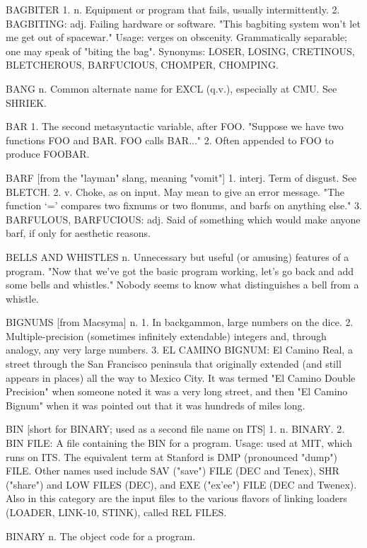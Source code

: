 BAGBITER 1. n. Equipment or program that fails, usually
   intermittently.  2. BAGBITING: adj. Failing hardware or software.
   "This bagbiting system won't let me get out of spacewar."  Usage:
   verges on obscenity.	 Grammatically separable; one may speak of
   "biting the bag".  Synonyms: LOSER, LOSING, CRETINOUS, BLETCHEROUS,
   BARFUCIOUS, CHOMPER, CHOMPING.

BANG n. Common alternate name for EXCL (q.v.), especially at CMU.  See
   SHRIEK.

BAR 1. The second metasyntactic variable, after FOO.  "Suppose we have
   two functions FOO and BAR.  FOO calls BAR..."  2. Often appended to
   FOO to produce FOOBAR.

BARF [from the "layman" slang, meaning "vomit"] 1. interj. Term of
   disgust.  See BLETCH.  2. v. Choke, as on input.  May mean to give
   an error message.  "The function `=' compares two fixnums or two
   flonums, and barfs on anything else."  3. BARFULOUS, BARFUCIOUS:
   adj. Said of something which would make anyone barf, if only for
   aesthetic reasons.

BELLS AND WHISTLES n. Unnecessary but useful (or amusing) features of
   a program.  "Now that we've got the basic program working, let's go
   back and add some bells and whistles."  Nobody seems to know what
   distinguishes a bell from a whistle.

BIGNUMS [from Macsyma] n. 1. In backgammon, large numbers on the dice.
   2. Multiple-precision (sometimes infinitely extendable) integers
   and, through analogy, any very large numbers.  3. EL CAMINO BIGNUM:
   El Camino Real, a street through the San Francisco peninsula that
   originally extended (and still appears in places) all the way to
   Mexico City.	 It was termed "El Camino Double Precision" when
   someone noted it was a very long street, and then "El Camino
   Bignum" when it was pointed out that it was hundreds of miles long.

BIN [short for BINARY; used as a second file name on ITS] 1. n.
   BINARY.  2. BIN FILE: A file containing the BIN for a program.
   Usage: used at MIT, which runs on ITS.  The equivalent term at
   Stanford is DMP (pronounced "dump") FILE.  Other names used include
   SAV ("save") FILE (DEC and Tenex), SHR ("share") and LOW FILES
   (DEC), and EXE ("ex'ee") FILE (DEC and Twenex).  Also in this
   category are the input files to the various flavors of linking
   loaders (LOADER, LINK-10, STINK), called REL FILES.

BINARY n. The object code for a program.

